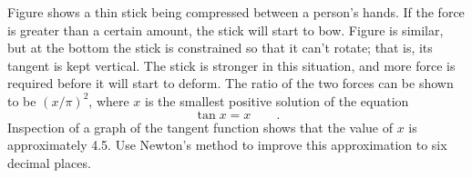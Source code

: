 Figure  shows a thin stick 
being compressed between a person's
hands. If the force is greater than a certain amount,
the stick will start to bow. Figure 
is similar, but at the bottom the stick is constrained
so that it can't rotate; that is, its tangent is kept vertical.
The stick is stronger in this situation, and more force
is required before it will start to deform. The ratio of the
two forces can be shown to be $(x/\pi)^2$, where $x$ is the
smallest positive solution of the equation
\begin{equation*}
  \tan x = x \qquad .
\end{equation*}
Inspection of a graph of the tangent function shows that the
value of $x$ is approximately 4.5. Use Newton's method to improve
this approximation to six decimal places.\answercheck
